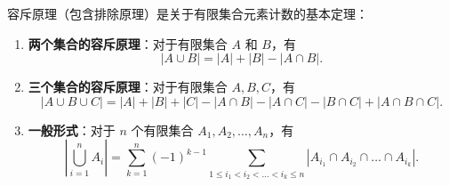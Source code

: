 \begin{statementbox}
容斥原理（包含排除原理）是关于有限集合元素计数的基本定理：
\begin{enumerate}
    \item \textbf{两个集合的容斥原理}：对于有限集合 $A$ 和 $B$，有
    \[
    |A \cup B| = |A| + |B| - |A \cap B|.
    \]
    \item \textbf{三个集合的容斥原理}：对于有限集合 $A, B, C$，有
    \[
    |A \cup B \cup C| = |A| + |B| + |C| - |A \cap B| - |A \cap C| - |B \cap C| + |A \cap B \cap C|.
    \]
    \item \textbf{一般形式}：对于 $n$ 个有限集合 $A_1, A_2, \dots, A_n$，有
    \[
    \left|\bigcup_{i=1}^n A_i\right| = \sum_{k=1}^n (-1)^{k-1} \sum_{1 \le i_1 < i_2 < \dots < i_k \le n} |A_{i_1} \cap A_{i_2} \cap \dots \cap A_{i_k}|.
    \]
\end{enumerate}
\end{statementbox}